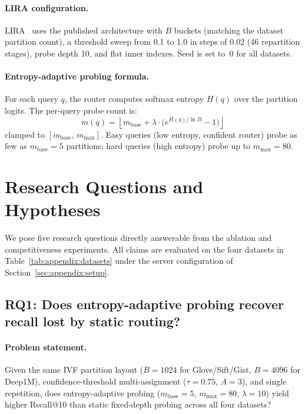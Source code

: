 \paragraph{LIRA configuration.}
LIRA~\cite{lira} uses the published architecture with $B$ buckets (matching
the dataset partition count), a threshold sweep from 0.1 to 1.0 in steps
of 0.02 (46 repartition stages), probe depth 10, and flat inner indexes.
Seed is set to~0 for all datasets.

\paragraph{Entropy-adaptive probing formula.}
For each query $q$, the router computes softmax entropy $H(q)$ over the
partition logits.  The per-query probe count is:
\begin{equation}
m(q) = \left\lfloor m_{\text{base}} + \lambda \cdot \bigl(e^{H(q)/\ln B} - 1\bigr) \right\rfloor
\label{eq:entropy_probing}
\end{equation}
clamped to $[m_{\text{base}},\, m_{\max}]$.  Easy queries (low entropy, confident
router) probe as few as $m_{\text{base}}=5$ partitions; hard queries (high
entropy) probe up to $m_{\max}=80$.

\section{Research Questions and Hypotheses}
\label{sec:appendix:rqs}

We pose five research questions directly answerable from the ablation and
competitiveness experiments.  All claims are evaluated on the four datasets
in Table~\ref{tab:appendix:datasets} under the server configuration of
Section~\ref{sec:appendix:setup}.

\subsection{RQ1: Does entropy-adaptive probing recover recall lost by static routing?}
\label{sec:appendix:rq1}

\paragraph{Problem statement.}
Given the same IVF partition layout ($B\!=\!1024$ for Glove/Sift/Gist,
$B\!=\!4096$ for Deep1M), confidence-threshold multi-assignment
($\tau\!=\!0.75$, $A\!=\!3$), and single repetition, does entropy-adaptive
probing ($m_{\text{base}}\!=\!5$, $m_{\max}\!=\!80$, $\lambda\!=\!10$) yield
higher Recall@10 than static fixed-depth probing across all four datasets?

